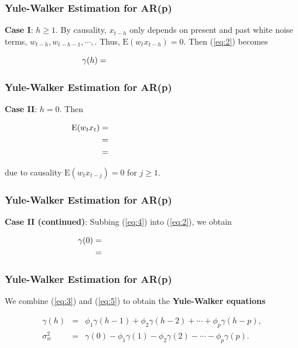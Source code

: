 \documentclass[%
xcolor=pdftex]{beamer}
\begin{document}
\begin{frame}
\frametitle{Yule-Walker Estimation for AR(p)}

\textbf{Case I}: $h \geq 1$. By causality, $x_{t-h}$ only depends on present and past white noise terms, $w_{t-h}, w_{t-h-1}, \cdots,$. Thus, $\mbox{E}(w_t x_{t-h}) = 0$. Then (\ref{eq:2}) becomes

\begin{equation} \label{eq:3}
\gamma(h) = \hspace{50mm}
\end{equation}

\end{frame}

\begin{frame}
\frametitle{Yule-Walker Estimation for AR(p)}

\textbf{Case II}: $h = 0$. Then

\begin{eqnarray} \label{eq:4}
\mbox{E}(w_t x_t) &=& \hspace{50mm} \nonumber \\
                  &=& \hspace{50mm} \nonumber \\
                  &=& \hspace{50mm}
\end{eqnarray}

due to causality $\mbox{E}(w_t x_{t-j}) = 0$ for $j \geq 1$.

\end{frame}

\begin{frame}
\frametitle{Yule-Walker Estimation for AR(p)}

\textbf{Case II (continued)}: Subbing (\ref{eq:4}) into (\ref{eq:2}), we obtain

\begin{eqnarray} \label{eq:5}
\gamma(0) &=& \hspace{50mm} \nonumber \\
          &=& \hspace{50mm}
\end{eqnarray}

\end{frame}

\begin{frame}
\frametitle{Yule-Walker Estimation for AR(p)}

We combine (\ref{eq:3}) and (\ref{eq:5}) to obtain the \textbf{Yule-Walker equations}

\begin{eqnarray*}
\gamma(h) &=&  \phi_1 \gamma(h-1) + \phi_2 \gamma(h-2) + \cdots + \phi_p \gamma(h-p),  \\
\sigma_{w}^2 &=& \gamma(0) - \phi_1 \gamma(1) - \phi_2 \gamma(2) - \cdots - \phi_p \gamma(p).
\end{eqnarray*}

\end{frame}
\end{document}
